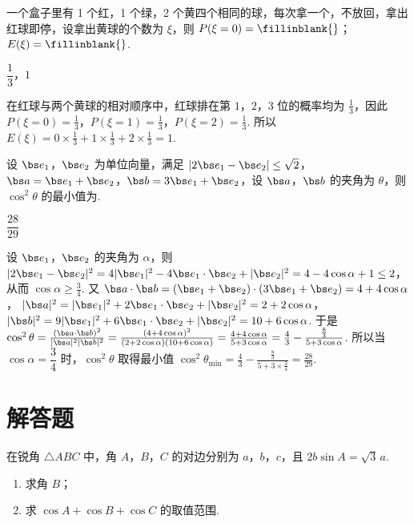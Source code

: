 \begin{problem}
一个盒子里有 1 个红，1 个绿，2 个黄四个相同的球，每次拿一个，不放回，拿出红球即停，设拿出黄球的个数为 \(\xi\)，则 \(P(\xi=0)=\fillinblank{}\)；\(E(\xi)=\fillinblank{}\).
\end{problem}

\begin{answer}
\(\dfrac13\)，\(1\)
\end{answer}

\begin{solution}
在红球与两个黄球的相对顺序中，红球排在第 \(1\)，\(2\)，\(3\) 位的概率均为 \(\frac13\)，因此
\(P(\xi=0)=\frac13\)，\(P(\xi=1)=\frac13\)，\(P(\xi=2)=\frac13\).
所以
\(E(\xi)=0\times\frac13+1\times\frac13+2\times\frac13=1\).
\end{solution}

\begin{problem}
设 \(\bs e_1\)，\(\bs e_2\) 为单位向量，满足 \(|2\bs e_1-\bs e_2|\le\sqrt2\)，\(\bs a=\bs e_1+\bs e_2\)，\(\bs b=3\bs e_1+\bs e_2\)，设 \(\bs a\)，\(\bs b\) 的夹角为 \(\theta\)，则 \(\cos^2\theta\) 的最小值为\fillinblank{}.
\end{problem}

\begin{answer}
\(\dfrac{28}{29}\)
\end{answer}

\begin{solution}
设 \(\bs e_1\)，\(\bs e_2\) 的夹角为 \(\alpha\)，则
\(|2\bs e_1-\bs e_2|^2=4|\bs e_1|^2-4\bs e_1\cdot\bs e_2+|\bs e_2|^2=4-4\cos\alpha+1\le2\)，
从而
\(\cos\alpha\ge\frac34\).
又
\(\bs a\cdot\bs b=(\bs e_1+\bs e_2)\cdot(3\bs e_1+\bs e_2)=4+4\cos\alpha\)，
\(|\bs a|^2=|\bs e_1|^2+2\bs e_1\cdot\bs e_2+|\bs e_2|^2=2+2\cos\alpha\)，
\(|\bs b|^2=9|\bs e_1|^2+6\bs e_1\cdot\bs e_2+|\bs e_2|^2=10+6\cos\alpha\).
于是
\(\cos^2\theta=\frac{(\bs a\cdot\bs b)^2}{|\bs a|^2|\bs b|^2} =\frac{(4+4\cos\alpha)^2}{(2+2\cos\alpha)(10+6\cos\alpha)} =\frac{4+4\cos\alpha}{5+3\cos\alpha} =\frac43-\frac{\frac83}{5+3\cos\alpha}\).
所以当 \(\cos\alpha=\dfrac34\) 时，\(\cos^2\theta\) 取得最小值
\(\cos^2\theta_{\min}=\frac43-\frac{\frac83}{5+3\times\frac34}=\frac{28}{29}\).
\end{solution}

\section{解答题}

\begin{problem}
在锐角 \(\triangle ABC\) 中，角 \(A\)，\(B\)，\(C\) 的对边分别为 \(a\)，\(b\)，\(c\)，且 \(2b\sin A=\sqrt3\,a\).

\begin{enumerate}
\item 求角 \(B\)；

\item 求 \(\cos A+\cos B+\cos C\) 的取值范围.
\end{enumerate}
\end{problem}

